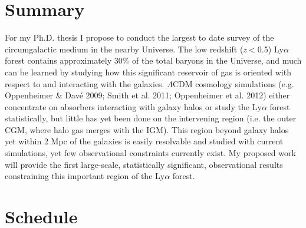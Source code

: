 \documentclass[iop]{emulateapj-rtx4}
\begin{document}
\vspace{10pt}
\section{Summary}

For my Ph.D. thesis I propose to conduct the largest to date survey of the circumgalactic medium in the nearby Universe. The low redshift (\textit{z}$<$0.5) Ly$\alpha$ forest contains approximately 30$\%$ of the total baryons in the Universe, and much can be learned by studying how this significant reservoir of gas is oriented with respect to and interacting with the galaxies. $\Lambda$CDM cosmology simulations (e.g. Oppenheimer \& Dav{\'e} 2009; Smith et al. 2011; Oppenheimer et al. 2012) either concentrate on absorbers interacting with galaxy halos or study the Ly$\alpha$ forest statistically, but little has yet been done on the intervening region (i.e. the outer CGM, where halo gas merges with the IGM). This region beyond galaxy halos yet within 2 Mpc of the galaxies is easily resolvable and studied with current simulations, yet few observational constraints currently exist. My proposed work will provide the first large-scale, statistically significant, observational results constraining this important region of the Ly$\alpha$ forest. 



\section{Schedule}
\end{document}
